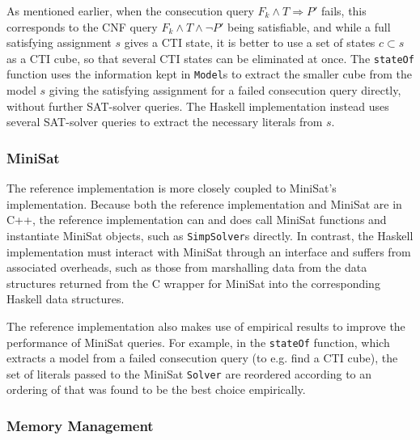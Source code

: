 \documentclass[12pt,a4paper,twoside,openright]{report}
\begin{document}
{%

As mentioned earlier, when the consecution query $F_k \wedge T \Rightarrow P'$ fails, this corresponds
to the CNF query $F_k \wedge T \wedge \neg P'$ being satisfiable, and while a full satisfying assignment
$s$ gives a CTI state, it is better to use a set of states $c \subset s$ as a CTI cube, so that several
CTI states can be eliminated at once.
The \verb,stateOf, function uses the information kept in \verb,Model,s to extract the smaller
cube from the model $s$ giving the satisfying assignment for a failed consecution query directly,
without further SAT-solver queries.
The Haskell implementation instead uses several SAT-solver queries to extract the necessary literals
from $s$.

\subsubsection{MiniSat}
The reference implementation is more closely coupled to MiniSat's implementation. Because both the reference
implementation and MiniSat are in C++, the reference implementation can and does call MiniSat functions
and instantiate MiniSat objects, such as \verb,SimpSolver,s directly. In contrast, the Haskell implementation
must interact with MiniSat through an interface and suffers from associated overheads, such as those from
marshalling data from the data structures returned from the C wrapper for MiniSat into the corresponding
Haskell data structures.

The reference implementation also makes use of empirical results to improve the performance of MiniSat queries.
For example, in the \verb,stateOf, function, which extracts a model from a failed consecution query
(to e.g. find a CTI cube), the set of literals passed to the MiniSat \verb,Solver, are reordered according
to an ordering of that was found to be the best choice empirically.

\subsubsection{Memory Management}

}
\end{document}

